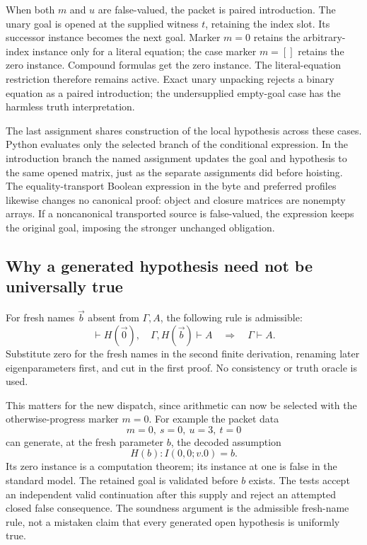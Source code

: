 When both $m$ and $u$ are false-valued, the packet is paired introduction.
The unary goal is opened at the supplied witness $t$, retaining the
index slot. Its successor instance becomes the next goal. Marker
$m=0$ retains the arbitrary-index instance only for a literal equation;
the case marker $m=[]$ retains the zero instance. Compound formulas get
the zero instance. The literal-equation restriction therefore remains
active. Exact unary unpacking rejects a binary equation as a paired
introduction; the undersupplied empty-goal case has the harmless truth
interpretation.

The last assignment shares construction of the local hypothesis across
these cases. Python evaluates only the selected branch of the conditional
expression. In the introduction branch the named assignment updates
the goal and hypothesis to the same opened matrix, just as the separate
assignments did before hoisting. The equality-transport Boolean
expression in the byte and preferred profiles likewise changes no
canonical proof: object and closure matrices are nonempty arrays. If
a noncanonical transported source is false-valued, the expression keeps
the original goal, imposing the stronger unchanged obligation.

\subsection{Why a generated hypothesis need not be universally true}

For fresh names $\vec b$ absent from $\Gamma,A$, the following rule is
admissible:
\[
 \vdash H(\vec0),\quad \Gamma,H(\vec b)\vdash A
 \quad\Longrightarrow\quad\Gamma\vdash A.
\]
Substitute zero for the fresh names in the second finite derivation,
renaming later eigenparameters first, and cut in the first proof.
No consistency or truth oracle is used.

This matters for the new dispatch, since arithmetic can now be selected
with the otherwise-progress marker $m=0$. For example the packet data
\[
                         m=0,\ s=0,\ u=3,\ t=0
\]
can generate, at the fresh parameter $b$, the decoded assumption
\[
                         H(b): I(0,0;v.0)=b.
\]
Its zero instance is a computation theorem; its instance at one is
false in the standard model. The retained goal is validated before
$b$ exists. The tests accept an independent valid continuation after
this supply and reject an attempted closed false consequence. The
soundness argument is the admissible fresh-name rule, not a mistaken
claim that every generated open hypothesis is uniformly true.

